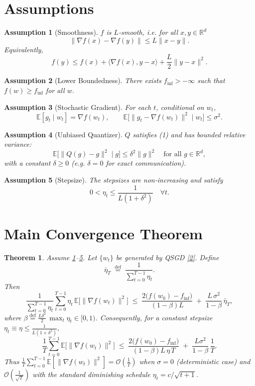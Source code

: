 \documentclass{article}
\newtheorem{theorem}{Theorem}
\newtheorem{assumption}{Assumption}
\newcommand{\E}{\mathbb{E}}
\newcommand{\R}{\mathbb{R}}
\begin{document}
\newpage

\section*{Assumptions}
\begin{assumption}[Smoothness]\label{as:smooth}
$f$ is $L$‑smooth, i.e. for all $x,y\in\R^{d}$
\[
\|\nabla f(x)-\nabla f(y)\|\le L\|x-y\|.
\tag{A1}
\]
Equivalently,
\[
f(y)\le f(x)+\langle\nabla f(x),y-x\rangle+\frac{L}{2}\|y-x\|^{2}.
\tag{A1'}
\]
\end{assumption}

\begin{assumption}[Lower Boundedness]\label{as:lb}
There exists $f_{\inf}>-\infty$ such that $f(w)\ge f_{\inf}$ for all $w$.
\end{assumption}

\begin{assumption}[Stochastic Gradient]\label{as:sg}
For each $t$, conditional on $w_{t}$,
\[
\E[g_{t}\mid w_{t}]=\nabla f(w_{t}),\qquad 
\E\big[\|g_{t}-\nabla f(w_{t})\|^{2}\mid w_{t}\big]\le\sigma^{2}.
\tag{A3}
\]
\end{assumption}

\begin{assumption}[Unbiased Quantizer]\label{as:quant}
$Q$ satisfies (1) and has bounded relative variance:
\[
\E\big[\|Q(g)-g\|^{2}\mid g\big]\le \delta^{2}\|g\|^{2}
\quad\text{for all }g\in\R^{d},
\tag{A4}
\]
with a constant $\delta\ge0$ (e.g. $\delta=0$ for exact communication).
\end{assumption}

\begin{assumption}[Stepsize]\label{as:step}
The stepsizes are non‑increasing and satisfy
\[
0<\eta_{t}\le\frac{1}{L(1+\delta^{2})}\quad\forall t.
\tag{A5}
\]
\end{assumption}

\section*{Main Convergence Theorem}
\begin{theorem}\label{thm:main}
Assume \ref{as:smooth}–\ref{as:step}. Let $\{w_{t}\}$ be generated by QSGD \eqref{2}. Define
\[
\bar\eta_{T}\;\stackrel{\text{def}}{=}\;\frac{1}{\sum_{t=0}^{T-1}\eta_{t}}.
\]
Then
\[
\boxed{
\frac{1}{\sum_{t=0}^{T-1}\eta_{t}}
\sum_{t=0}^{T-1}\eta_{t}\,
\E\big[\|\nabla f(w_{t})\|^{2}\big]
\;\le\;
\frac{2\big(f(w_{0})-f_{\inf}\big)}{(1-\beta)L}
\;+\;
\frac{L\,\sigma^{2}}{1-\beta}\,
\bar\eta_{T},
}
\tag{3}
\]
where $\beta\stackrel{\text{def}}{=}\frac{L\delta^{2}}{2}\,\max_{t}\eta_{t}\in[0,1)$.  
Consequently, for a constant stepsize $\eta_{t}\equiv\eta\le\frac{1}{L(1+\delta^{2})}$,
\[
\frac{1}{T}\sum_{t=0}^{T-1}\E\big[\|\nabla f(w_{t})\|^{2}\big]
\;\le\;
\frac{2\big(f(w_{0})-f_{\inf}\big)}{(1-\beta)L\,\eta\,T}
\;+\;
\frac{L\sigma^{2}}{1-\beta}\,\frac{1}{T}.
\tag{4}
\]
Thus $\displaystyle\frac{1}{T}\sum_{t=0}^{T-1}\E[\|\nabla f(w_{t})\|^{2}]=\mathcal O\!\left(\frac{1}{T}\right)$
when $\sigma=0$ (deterministic case) and $\mathcal O\!\left(\frac{1}{\sqrt{T}}\right)$ with the standard diminishing schedule $\eta_{t}=c/\sqrt{t+1}$.
\end{theorem}
\end{document}
